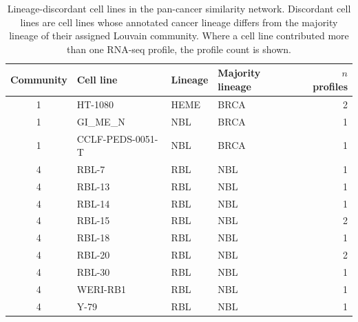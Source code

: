 \begin{table}[H]
  \centering
  \caption{Lineage-discordant cell lines in the pan-cancer similarity network. Discordant cell lines are cell lines
  whose annotated cancer lineage differs from the majority lineage of their
  assigned Louvain community. Where a cell line contributed more than one
  RNA-seq profile, the profile count is shown.}
  \label{tab:supp_discordant_profiles}
  \begin{tabular}{@{}clllr@{}}
  \toprule
  Community & Cell line & Lineage & Majority lineage & $n$ profiles \\
  \midrule
  1 & HT-1080          & HEME & BRCA & 2 \\
  1 & GI\_ME\_N        & NBL  & BRCA & 1 \\
  1 & CCLF-PEDS-0051-T & NBL  & BRCA & 1 \\
  4 & RBL-7            & RBL  & NBL  & 1 \\
  4 & RBL-13           & RBL  & NBL  & 1 \\
  4 & RBL-14           & RBL  & NBL  & 1 \\
  4 & RBL-15           & RBL  & NBL  & 2 \\
  4 & RBL-18           & RBL  & NBL  & 1 \\
  4 & RBL-20           & RBL  & NBL  & 2 \\
  4 & RBL-30           & RBL  & NBL  & 1 \\
  4 & WERI-RB1         & RBL  & NBL  & 1 \\
  4 & Y-79             & RBL  & NBL  & 1 \\
  \bottomrule
  \end{tabular}
\end{table}
